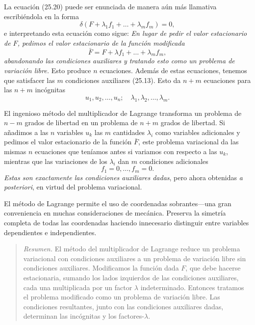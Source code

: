 \documentclass[12pt,a4paper]{book}
\begin{document}
La ecuación (25.20) puede ser enunciada de manera aún más llamativa escribiéndola en la forma
\begin{equation}
\delta(F + \lambda_1 f_1 + \ldots + \lambda_m f_m) = 0, \tag{25.21}
\end{equation}
e interpretando esta ecuación como sigue: \textit{En lugar de pedir el valor estacionario de $F$, pedimos el valor estacionario de la función modificada}
\begin{equation}
\bar{F} = F + \lambda f_1 + \ldots + \lambda_m f_m, \tag{25.22}
\end{equation}
\textit{abandonando las condiciones auxiliares y tratando esto como un problema de variación libre.} Esto produce $n$ ecuaciones. Además de estas ecuaciones, tenemos que satisfacer las $m$ condiciones auxiliares (25.13). Esto da $n + m$ ecuaciones para las $n + m$ incógnitas
\begin{equation}
u_1, u_2, \ldots, u_n; \quad \lambda_1, \lambda_2, \ldots, \lambda_m. \tag{25.23}
\end{equation}

El ingenioso método del multiplicador de Lagrange transforma un problema de $n - m$ grados de libertad en un problema de $n + m$ grados de libertad. Si añadimos a las $n$ variables $u_k$ las $m$ cantidades $\lambda_i$ como variables adicionales y pedimos el valor estacionario de la función $\bar{F}$, este problema variacional da las mismas $n$ ecuaciones que teníamos antes si variamos con respecto a las $u_k$, mientras que las variaciones de los $\lambda_i$ dan $m$ condiciones adicionales
\begin{equation}
f_1 = 0, \ldots, f_m = 0. \tag{25.24}
\end{equation}
\textit{Estas son exactamente las condiciones auxiliares dadas}, pero ahora obtenidas \textit{a posteriori}, en virtud del problema variacional.

El método de Lagrange permite el uso de coordenadas sobrantes---una gran conveniencia en muchas consideraciones de mecánica. Preserva la simetría completa de todas las coordenadas haciendo innecesario distinguir entre variables dependientes e independientes.

\begin{quote}
\textit{Resumen.} El método del multiplicador de Lagrange reduce un problema variacional con condiciones auxiliares a un problema de variación libre sin condiciones auxiliares. Modificamos la función dada $F$, que debe hacerse estacionaria, sumando los lados izquierdos de las condiciones auxiliares, cada una multiplicada por un factor $\lambda$ indeterminado. Entonces tratamos el problema modificado como un problema de variación libre. Las condiciones resultantes, junto con las condiciones auxiliares dadas, determinan las incógnitas y los factores-$\lambda$.
\end{quote}
\end{document}

